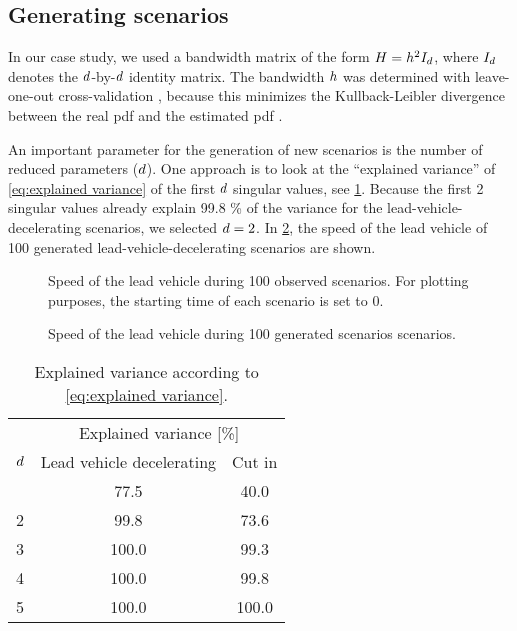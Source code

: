 \subsection{Generating scenarios}
\label{sec:case study parameter reduction}

In our case study, we used a bandwidth matrix of the form $H=h^2 I_{d}$, where $I_{d}$ denotes the $d$-by-$d$ identity matrix.
The bandwidth $h$ was determined with leave-one-out cross-validation \autocite{duin1976parzen}, because this minimizes the Kullback-Leibler divergence between the real \ac{pdf} and the estimated \ac{pdf} \autocite{turlach1993bandwidthselection, zambom2013review}.

An important parameter for the generation of new scenarios is the number of reduced parameters ($d$).
One approach is to look at the ``explained variance'' of \cref{eq:explained variance} of the first $d$ singular values, see \cref{tab:explained variance}.
Because the first 2 singular values already explain 99.8 \% of the variance for the lead-vehicle-decelerating scenarios, we selected $d=2$.
In \cref{fig:speed lvd generated}, the speed of the lead vehicle of 100 generated lead-vehicle-decelerating scenarios are shown.

\setlength{\figurewidth}{.97\linewidth}
\setlength{\figureheight}{.7\figurewidth}
\begin{figure}
	\centering
	
	\caption{Speed of the lead vehicle during 100 observed scenarios. For plotting purposes, the starting time of each scenario is set to 0.}
	\label{fig:speed lvd observed}
\end{figure}

\begin{figure}
	\centering
	
	\caption{Speed of the lead vehicle during 100 generated scenarios scenarios.}
	\label{fig:speed lvd generated}
\end{figure}

\begin{table}
	\centering
	\caption{Explained variance according to \cref{eq:explained variance}.}
	\label{tab:explained variance}
	\begin{tabular}{lcc}
		\toprule
		& \multicolumn{2}{c}{Explained variance [\%]} \\
		$d$ & Lead vehicle decelerating & Cut in \\ \otoprule
		1 & 77.5 & 40.0 \\
		2 & 99.8 & 73.6 \\
		3 & 100.0 & 99.3 \\
		4 & 100.0 & 99.8 \\
		5 & 100.0 & 100.0 \\
		\bottomrule
	\end{tabular}
\end{table}


